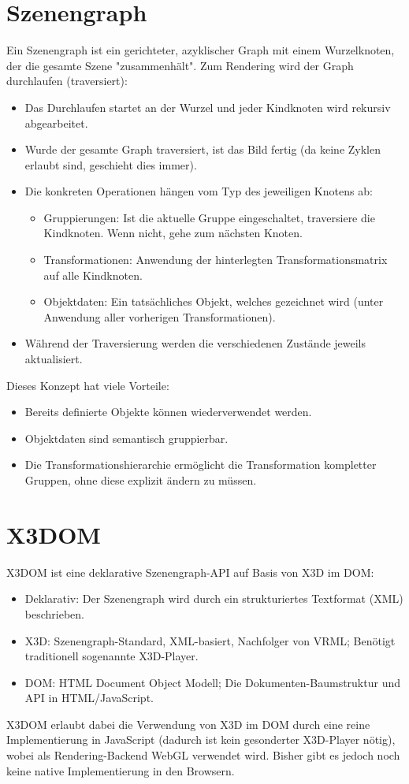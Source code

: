 	\section{Szenengraph}
		Ein Szenengraph ist ein gerichteter, azyklischer Graph mit einem Wurzelknoten, der die gesamte Szene "zusammenhält". Zum Rendering wird der Graph durchlaufen (traversiert):
		\begin{itemize}
			\item Das Durchlaufen startet an der Wurzel und jeder Kindknoten wird rekursiv abgearbeitet.
			\item Wurde der gesamte Graph traversiert, ist das Bild fertig (da keine Zyklen erlaubt sind, geschieht dies immer).
			\item Die konkreten Operationen hängen vom Typ des jeweiligen Knotens ab:
				\begin{itemize}
					\item Gruppierungen: Ist die aktuelle Gruppe eingeschaltet, traversiere die Kindknoten. Wenn nicht, gehe zum nächsten Knoten.
					\item Transformationen: Anwendung der hinterlegten Transformationsmatrix auf alle Kindknoten.
					\item Objektdaten: Ein tatsächliches Objekt, welches gezeichnet wird (unter Anwendung aller vorherigen Transformationen).
				\end{itemize}
			\item Während der Traversierung werden die verschiedenen Zustände jeweils aktualisiert.
		\end{itemize}
		Dieses Konzept hat viele Vorteile:
		\begin{itemize}
			\item Bereits definierte Objekte können wiederverwendet werden.
			\item Objektdaten sind semantisch gruppierbar.
			\item Die Transformationshierarchie ermöglicht die Transformation kompletter Gruppen, ohne diese explizit ändern zu müssen.
		\end{itemize}

	\section{X3DOM}
		X3DOM ist eine deklarative Szenengraph-API auf Basis von X3D im DOM:
		\begin{itemize}
			\item Deklarativ: Der Szenengraph wird durch ein strukturiertes Textformat (\zB XML) beschrieben.
			\item X3D: Szenengraph-Standard, XML-basiert, Nachfolger von VRML; Benötigt traditionell sogenannte X3D-Player.
			\item DOM: HTML Document Object Modell; Die Dokumenten-Baumstruktur und API in HTML/JavaScript.
		\end{itemize}
		X3DOM erlaubt dabei die Verwendung von X3D im DOM durch eine reine Implementierung in JavaScript (dadurch ist kein gesonderter X3D-Player nötig), wobei als Rendering-Backend \zB WebGL verwendet wird. Bisher gibt es jedoch noch keine native Implementierung in den Browsern.

